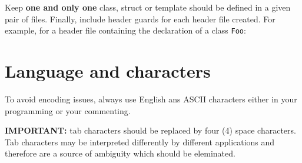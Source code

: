 
Keep \textbf{one and only one} class, struct or template should be defined 
in a given pair of files. Finally, include header guards for each header file 
created. For example, for a header file containing the declaration of a class 
\texttt{Foo}:


\section{Language and characters}
To avoid encoding issues, always use English ans ASCII characters either in 
your programming or your commenting.

\textbf{IMPORTANT:} tab characters should be replaced by four (4) space 
characters. Tab characters may be interpreted differently by different 
applications and therefore are a source of ambiguity which should be eleminated.